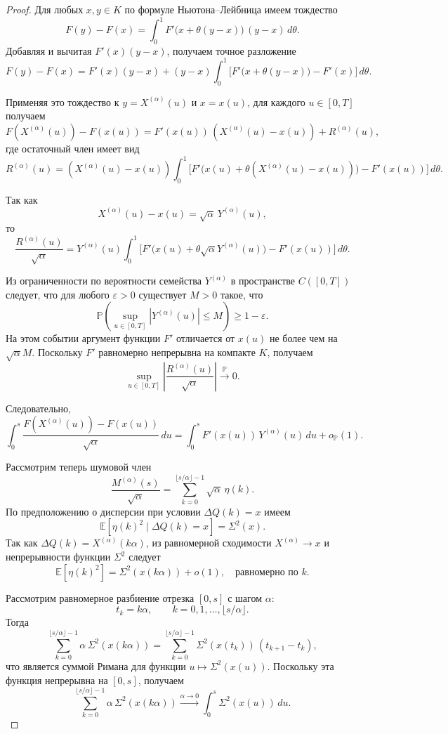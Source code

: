 \documentclass[12pt,a4paper]{article}
\theoremstyle{definition}
\begin{document}
\begin{proof}
Для любых $x,y\in K$ по формуле Ньютона--Лейбница имеем тождество
\[
F(y)-F(x)
=
\int_0^1 F'\bigl(x+\theta(y-x)\bigr)\,(y-x)\,d\theta.
\]
Добавляя и вычитая $F'(x)(y-x)$, получаем точное разложение
\[
F(y)-F(x)
=
F'(x)(y-x)
+
(y-x)
\int_0^1
\bigl[
F'\bigl(x+\theta(y-x)\bigr)-F'(x)
\bigr]
\,d\theta.
\]

Применяя это тождество к
$y = X^{(\alpha)}(u)$ и $x = x(u)$,
для каждого $u\in[0,T]$ получаем
\[
F(X^{(\alpha)}(u))-F(x(u))
=
F'(x(u))\,(X^{(\alpha)}(u)-x(u))
+
R^{(\alpha)}(u),
\]
где остаточный член имеет вид
\[
R^{(\alpha)}(u)
=
(X^{(\alpha)}(u)-x(u))
\int_0^1
\bigl[
F'\bigl(x(u)+\theta(X^{(\alpha)}(u)-x(u))\bigr)
-
F'(x(u))
\bigr]
\,d\theta.
\]

Так как
\[
X^{(\alpha)}(u)-x(u)=\sqrt{\alpha}\,Y^{(\alpha)}(u),
\]
то
\[
\frac{R^{(\alpha)}(u)}{\sqrt{\alpha}}
=
Y^{(\alpha)}(u)
\int_0^1
\bigl[
F'\bigl(x(u)+\theta\sqrt{\alpha}Y^{(\alpha)}(u)\bigr)
-
F'(x(u))
\bigr]
\,d\theta.
\]

Из ограниченности по вероятности семейства $Y^{(\alpha)}$
в пространстве $C([0,T])$ следует, что для любого $\varepsilon>0$
существует $M>0$ такое, что
\[
\mathbb P\!\left(
\sup_{u\in[0,T]} |Y^{(\alpha)}(u)| \le M
\right)\ge 1-\varepsilon.
\]
На этом событии аргумент функции $F'$
отличается от $x(u)$ не более чем на $\sqrt{\alpha}M$.
Поскольку $F'$ равномерно непрерывна на компакте $K$,
получаем
\[
\sup_{u\in[0,T]}
\left|
\frac{R^{(\alpha)}(u)}{\sqrt{\alpha}}
\right|
\xrightarrow{\;\mathbb P\;}
0.
\]

Следовательно,
\[
\int_0^s
\frac{F(X^{(\alpha)}(u))-F(x(u))}{\sqrt{\alpha}}
\,du
=
\int_0^s
F'(x(u))\,Y^{(\alpha)}(u)\,du
+
o_{\mathbb P}(1).
\]

Рассмотрим теперь шумовой член
\[
\frac{M^{(\alpha)}(s)}{\sqrt{\alpha}}
=
\sum_{k=0}^{\lfloor s/\alpha \rfloor-1}
\sqrt{\alpha}\,\eta(k).
\]
По предположению о дисперсии при условии
$\Delta Q(k)=x$ имеем
\[
\mathbb E[\eta(k)^2\mid \Delta Q(k)=x]
=
\Sigma^2(x).
\]
Так как $\Delta Q(k)=X^{(\alpha)}(k\alpha)$,
из равномерной сходимости $X^{(\alpha)}\to x$
и непрерывности функции $\Sigma^2$
следует
\[
\mathbb E[\eta(k)^2]
=
\Sigma^2(x(k\alpha))
+
o(1),
\quad
\text{равномерно по } k.
\]

Рассмотрим равномерное разбиение отрезка $[0,s]$
с шагом $\alpha$:
\[
t_k = k\alpha,
\qquad
k=0,1,\dots,\lfloor s/\alpha \rfloor.
\]
Тогда
\[
\sum_{k=0}^{\lfloor s/\alpha \rfloor-1}
\alpha\,\Sigma^2(x(k\alpha))
=
\sum_{k=0}^{\lfloor s/\alpha \rfloor-1}
\Sigma^2(x(t_k))\,(t_{k+1}-t_k),
\]
что является суммой Римана для функции
$u\mapsto \Sigma^2(x(u))$.
Поскольку эта функция непрерывна на $[0,s]$,
получаем
\[
\sum_{k=0}^{\lfloor s/\alpha \rfloor-1}
\alpha\,\Sigma^2(x(k\alpha))
\xrightarrow{\alpha\to0}
\int_0^s \Sigma^2(x(u))\,du.
\]


\end{proof}
\end{document}
